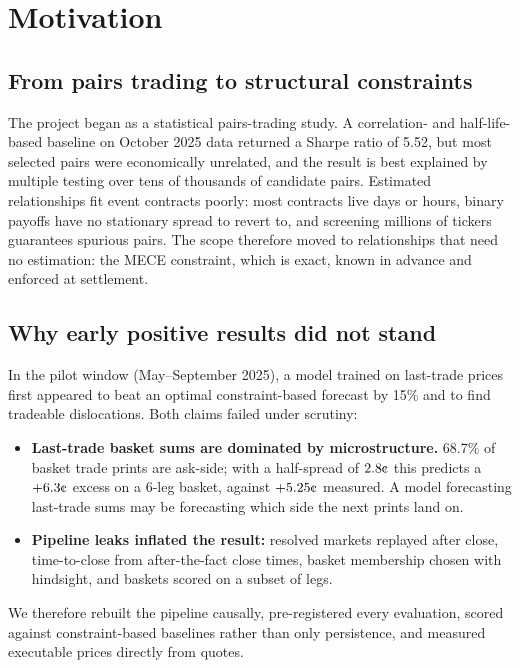 \documentclass[11pt,a4paper]{article}
\newcommand{\cent}{\text{\textcent}}
\begin{document}
\section{Motivation}

\subsection{From pairs trading to structural constraints}
The project began as a statistical pairs-trading study. A correlation- and half-life-based baseline on October 2025
data returned a Sharpe ratio of 5.52, but most selected pairs were economically unrelated, and the result is best
explained by multiple testing over tens of thousands of candidate pairs. Estimated relationships fit event contracts
poorly: most contracts live days or hours, binary payoffs have no stationary spread to revert to, and screening
millions of tickers guarantees spurious pairs. The scope therefore moved to relationships that need no estimation:
the MECE constraint, which is exact, known in advance and enforced at settlement.

\subsection{Why early positive results did not stand}
In the pilot window (May--September 2025), a model trained on last-trade prices first appeared to beat an optimal
constraint-based forecast by 15\% and to find tradeable dislocations. Both claims failed under scrutiny:
\begin{itemize}
  \item \textbf{Last-trade basket sums are dominated by microstructure.} 68.7\% of basket trade prints are ask-side;
    with a half-spread of $2.8\cent$ this predicts a $+6.3\cent$ excess on a 6-leg basket, against $+5.25\cent$
    measured. A model forecasting last-trade sums may be forecasting which side the next prints land on.
  \item \textbf{Pipeline leaks inflated the result:} resolved markets replayed after close, time-to-close from
    after-the-fact close times, basket membership chosen with hindsight, and baskets scored on a subset of legs.
\end{itemize}
We therefore rebuilt the pipeline causally, pre-registered every evaluation, scored against constraint-based
baselines rather than only persistence, and measured executable prices directly from quotes.
\end{document}
